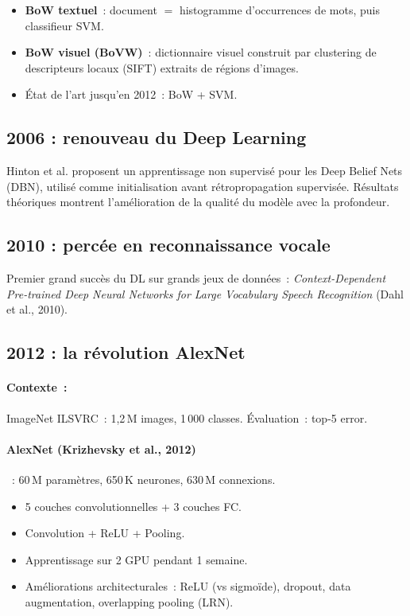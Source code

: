 \documentclass[a4paper,11pt]{article}
\theoremstyle{definition}
\theoremstyle{remark}
\begin{document}
\begin{itemize}
  \item \textbf{BoW textuel}~: document $=$ histogramme
    d'occurrences de mots, puis classifieur SVM.
  \item \textbf{BoW visuel (BoVW)}~: dictionnaire visuel construit
    par clustering de descripteurs locaux (SIFT) extraits de
    r\'egions d'images.
  \item \'Etat de l'art jusqu'en 2012~: BoW + SVM.
\end{itemize}

\subsection{2006 : renouveau du Deep Learning}

Hinton et al. proposent un apprentissage non supervis\'e pour les
Deep Belief Nets (DBN), utilis\'e comme initialisation avant
r\'etropropagation supervis\'ee. R\'esultats th\'eoriques montrent
l'am\'elioration de la qualit\'e du mod\`ele avec la profondeur.

\subsection{2010 : perc\'ee en reconnaissance vocale}

Premier grand succ\`es du DL sur grands jeux de donn\'ees~:
\emph{Context-Dependent Pre-trained Deep Neural Networks for Large
Vocabulary Speech Recognition} (Dahl et al., 2010).

\subsection{2012 : la r\'evolution AlexNet}

\paragraph{Contexte~:} ImageNet ILSVRC~: 1,2\,M images,
1\,000 classes. \'Evaluation~: top-5 error.

\paragraph{AlexNet (Krizhevsky et al., 2012)}~:
60\,M param\`etres, 650\,K neurones, 630\,M connexions.
\begin{itemize}
  \item 5 couches convolutionnelles + 3 couches FC.
  \item Convolution + ReLU + Pooling.
  \item Apprentissage sur 2 GPU pendant 1 semaine.
  \item Am\'eliorations architecturales~: ReLU (vs sigmo\"ide),
    dropout, data augmentation, overlapping pooling (LRN).
\end{itemize}
\end{document}
